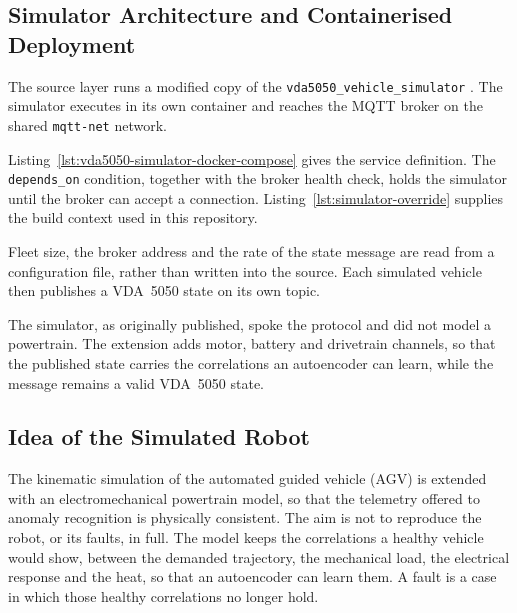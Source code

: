 \subsection{Simulator Architecture and Containerised Deployment}
\label{subsec:simulator_deployment}

The source layer runs a modified copy of the \texttt{vda5050\_vehicle\_simulator} \cite{bostanciVda5050}. The simulator executes in its own container and reaches the MQTT broker on the shared \texttt{mqtt-net} network.

Listing~\ref{lst:vda5050-simulator-docker-compose} gives the service definition. The \texttt{depends\_on} condition, together with the broker health check, holds the simulator until the broker can accept a connection. Listing~\ref{lst:simulator-override} supplies the build context used in this repository.

Fleet size, the broker address and the rate of the state message are read from a configuration file, rather than written into the source. Each simulated vehicle then publishes a VDA~5050 state on its own topic.

The simulator, as originally published, spoke the protocol and did not model a powertrain. The extension adds motor, battery and drivetrain channels, so that the published state carries the correlations an autoencoder can learn, while the message remains a valid VDA~5050 state.

\subsection{Idea of the Simulated Robot}
\label{subsec:simulated_robot}

The kinematic simulation of the automated guided vehicle (AGV) is extended with an electromechanical powertrain model, so that the telemetry offered to anomaly recognition is physically consistent. The aim is not to reproduce the robot, or its faults, in full. The model keeps the correlations a healthy vehicle would show, between the demanded trajectory, the mechanical load, the electrical response and the heat, so that an autoencoder can learn them. A fault is a case in which those healthy correlations no longer hold.

